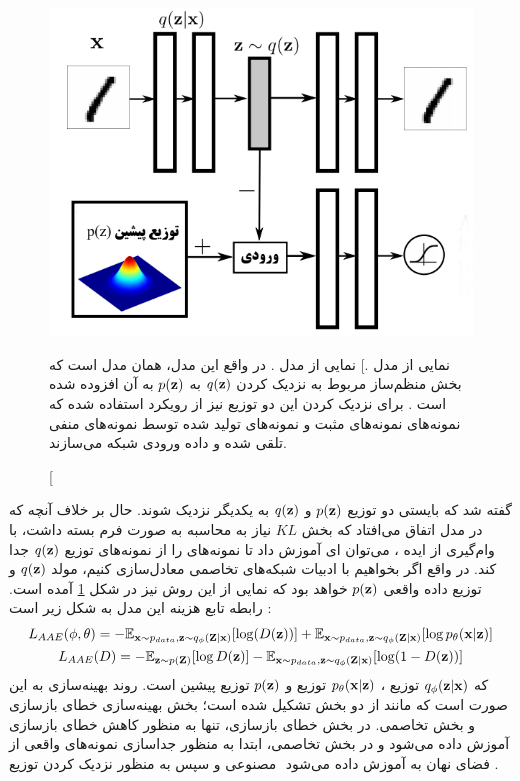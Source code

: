\begin{figure}[H]
	\centering
	\includegraphics[width=.6\textwidth]{images/aae.png}
	\caption
    [نمایی از مدل  \aae{}.]
    {
		نمایی از مدل  \aae{}. در واقع این مدل، همان مدل \autoencoder{} است که بخش منظم‌ساز مربوط به نزدیک کردن $q({\bf z})$ به $p({\bf z})$ به آن افزوده شده است \cite{aae}. برای نزدیک کردن این دو توزیع نیز از رویکرد \gan{} استفاده شده که نمونه‌های \priordist{} نمونه‌های مثبت و نمونه‌های تولید شده توسط \encoder{} نمونه‌های منفی تلقی شده و داده ورودی شبکه \discriminator{} می‌سازند.
	}
	\label{fig:aae}
\end{figure}
گفته شد که بایستی دو توزیع $p({\bf z})$ و $q({\bf z})$ به یکدیگر نزدیک شوند. حال بر خلاف آنچه که در مدل \vae{} اتفاق می‌افتاد که بخش $KL$ نیاز به محاسبه به صورت فرم بسته داشت، با وام‌گیری از ایده \gan{}، می‌توان \discriminator ‌ای آموزش داد تا نمونه‌های \priordist{} را از نمونه‌های توزیع \marginal
$q({\bf z})$
جدا کند. در واقع اگر بخواهیم با ادبیات شبکه‌های تخاصمی معادل‌سازی کنیم، مولد $q({\bf z})$ و توزیع داده واقعی $p({\bf z})$ خواهد بود که نمایی از این روش نیز در شکل \ref{fig:aae} آمده است. رابطه تابع هزینه این مدل به شکل زیر است \cite{aae}:
\begin{gather}
	L_{AAE}(\phi, \theta) =
	- \mathbb E_{{\bf x} \sim p_{data}, {\bf z} \sim q_\phi({\bf Z}|{\bf x})} [\log (D({\bf z}))]
	+ \mathbb E_{{\bf x} \sim p_{data}, {\bf z} \sim q_\phi({\bf Z}|{\bf x})}[\log p_\theta({\bf x}|{\bf z})]\\
	L_{AAE}(D) =
	- \mathbb E_{{\bf z} \sim p({\bf Z})} [\log D({\bf z})]
	- \mathbb E_{{\bf x} \sim p_{data},{\bf z} \sim q_\phi({\bf Z}|{\bf x})} [\log (1 - D({\bf z}))]
\end{gather}
که $q_\phi({\bf z}|{\bf x})$ توزیع \encoder{}،
$p_\theta({\bf x}|{\bf z})$
توزیع \decoder{} و $p({\bf z})$ توزیع پیشین است. روند بهینه‌سازی به این صورت است که مانند \gan{} از دو بخش تشکیل شده است؛ بخش بهینه‌سازی خطای بازسازی و بخش تخاصمی. در بخش خطای بازسازی، تنها \autoencoder{} به منظور کاهش خطای بازسازی آموزش داده می‌شود و در بخش تخاصمی، ابتدا \discriminator{} به منظور جداسازی نمونه‌های واقعی از مصنوعی و سپس \encoder{} به منظور نزدیک کردن توزیع \marginal{}‎ فضای نهان به \priordist{} آموزش داده می‌شود \cite{aae}.\\
